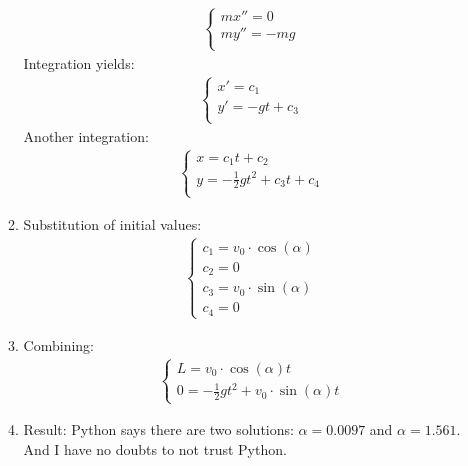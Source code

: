 \begin{enumerate}
\begin{enumerate}
\begin{align}
                        \begin{cases}
                            mx'' = 0   \\
                            my'' = -mg \\
                        \end{cases}
                    \end{align}
                    Integration yields:
                    \begin{align}
                        \begin{cases}
                            x' = c_1       \\
                            y' = -gt + c_3 \\
                        \end{cases}
                    \end{align}
                    Another integration: \\
                    \begin{align}
                        \begin{cases}
                            x = c_1 t + c_2                    \\
                            y = -\frac{1}{2}gt^2 + c_3 t + c_4 \\
                        \end{cases}
                    \end{align}
              \item Substitution of initial values:
                    \begin{align}
                        \begin{cases}
                            c_1 = v_0 \cdot \cos(\alpha) \\
                            c_2 = 0                      \\
                            c_3 = v_0 \cdot \sin(\alpha) \\
                            c_4 = 0
                        \end{cases}
                    \end{align}
              \item Combining:
                    \begin{align}
                        \begin{cases}
                            L = v_0 \cdot \cos(\alpha) t \\
                            0 = -\frac{1}{2}gt^2 + v_0 \cdot \sin(\alpha) t
                        \end{cases}
                    \end{align}
              \item Result:
                    Python says there are two solutions: $\alpha = 0.0097$ and $\alpha = 1.561$.
                    And I have no doubts to not trust Python.
          \end{enumerate}
\end{enumerate}

